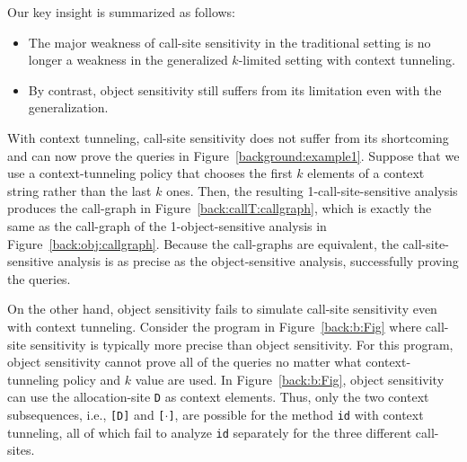 Our key insight is summarized as follows: 
\begin{itemize}[leftmargin=1.3em]
\item The major weakness of call-site sensitivity
in the traditional setting is no longer a weakness in the generalized
$k$-limited setting with context tunneling.%
\item By contrast, object sensitivity still suffers from its
limitation even with the generalization. 
\end{itemize}

With context tunneling, call-site sensitivity does not
suffer from its shortcoming and can now prove the queries in
Figure~\ref{background:example1}. Suppose that we use a
context-tunneling policy that chooses the first $k$ elements of a
context string rather than the last $k$ ones.
Then, the resulting
1-call-site-sensitive analysis produces the call-graph in Figure~\ref{back:callT:callgraph},
which is exactly the same as the
call-graph of the 1-object-sensitive analysis in
Figure~\ref{back:obj:callgraph}. Because the call-graphs are
equivalent, the call-site-sensitive analysis is as precise as the
object-sensitive analysis, successfully proving the queries. 



On the other hand, object sensitivity fails to simulate call-site
sensitivity even with context tunneling.  Consider the program in
Figure~\ref{back:b:Fig} where call-site sensitivity is
typically more precise than object sensitivity. For this program,
object sensitivity cannot prove all of the queries no matter what
context-tunneling policy and $k$ value are used. 
In
Figure~\ref{back:b:Fig}, object sensitivity can use the
allocation-site {\tt D} as context elements. Thus, only the two
context subsequences, i.e., \texttt{[D]} and \texttt{[$\cdot$]}, are
possible for the method {\tt id} with context tunneling, all of which
fail to analyze {\tt id} separately for the three different
call-sites.  %

